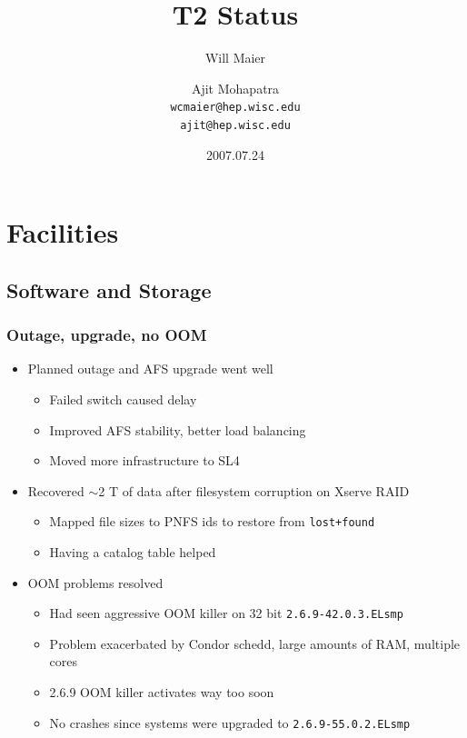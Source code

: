 \documentclass{beamer}
\title{T2 Status}
\author[Maier, Mohapatra]{
    Will Maier \and Ajit Mohapatra\\ 
    {\tt wcmaier@hep.wisc.edu}\\
    {\tt ajit@hep.wisc.edu}}
\institute[Wisconsin]{University of Wisconsin - High Energy Physics}
\date{2007.07.24}
\newcommand{\ca}{\ensuremath{\sim}}
\begin{document}
\begin{frame}
    \titlepage
\end{frame}


\section{Facilities}
\subsection{Software and Storage}
\begin{frame}
\frametitle{Outage, upgrade, no OOM}
\begin{itemize}
    \item Planned outage and AFS upgrade went well
    \begin{itemize}
        \item Failed switch caused delay
        \item Improved AFS stability, better load balancing
        \item Moved more infrastructure to SL4
    \end{itemize}
    \item Recovered \ca{}2 T of data after filesystem corruption on Xserve RAID
    \begin{itemize}
        \item Mapped file sizes to PNFS ids to restore from {\tt lost+found}
        \item Having a catalog table helped
    \end{itemize}
    \item OOM problems resolved
    \begin{itemize}
        \item Had seen aggressive OOM killer on 32 bit {\tt 2.6.9-42.0.3.ELsmp}
        \item Problem exacerbated by Condor schedd, large amounts of RAM, multiple cores
        \item 2.6.9 OOM killer activates way too soon
        \item No crashes since systems were upgraded to {\tt 2.6.9-55.0.2.ELsmp}
    \end{itemize}
\end{itemize}
\end{frame}
\end{document}

